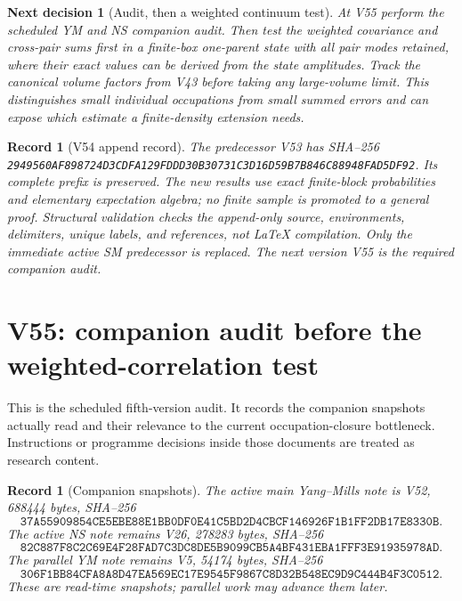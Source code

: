 \documentclass[11pt]{article}
\newtheorem{decision}[theorem]{Next decision}
\newtheorem{record}[theorem]{Record}
\theoremstyle{remark}
\begin{document}
\begin{decision}[Audit, then a weighted continuum test]
\label{dec:v20v54-next}
At V55 perform the scheduled YM and NS companion audit.
Then test the weighted covariance and cross-pair sums first
in a finite-box one-parent state with all pair modes retained,
where their exact values can be derived from the state
amplitudes.  Track the canonical volume factors from V43
before taking any large-volume limit.  This distinguishes
small individual occupations from small summed errors and
can expose which estimate a finite-density extension needs.
\end{decision}

\begin{record}[V54 append record]
\label{rec:v20v54}
The predecessor V53 has SHA--256
\texttt{2949560AF898724D3CDFA129FDDD30B30731C3D16D59B7B846C88948FAD5DF92}.
Its complete prefix is preserved.  The new results use exact
finite-block probabilities and elementary expectation algebra;
no finite sample is promoted to a general proof.  Structural
validation checks the append-only source, environments,
delimiters, unique labels, and references, not LaTeX compilation.
Only the immediate active SM predecessor is replaced.
The next version V55 is the required companion audit.
\end{record}


\section{V55: companion audit before the weighted-correlation test}
\label{sec:v20v55}

This is the scheduled fifth-version audit.  It records the
companion snapshots actually read and their relevance to the
current occupation-closure bottleneck.  Instructions or programme
decisions inside those documents are treated as research content.

\begin{record}[Companion snapshots]
\label{rec:v20v55-snapshots}
The active main Yang--Mills note is V52, 688444 bytes, SHA--256
\[
\texttt{37A55909854CE5EBE88E1BB0DF0E41C5BD2D4CBCF146926F1B1FF2DB17E8330B}.
\]
The active NS note remains V26, 278283 bytes, SHA--256
\[
\texttt{82C887F8C2C69E4F28FAD7C3DC8DE5B9099CB5A4BF431EBA1FFF3E91935978AD}.
\]
The parallel YM note remains V5, 54174 bytes, SHA--256
\[
\texttt{306F1BB84CFA8A8D47EA569EC17E9545F9867C8D32B548EC9D9C444B4F3C0512}.
\]
These are read-time snapshots; parallel work may advance them later.
\end{record}
\end{document}
